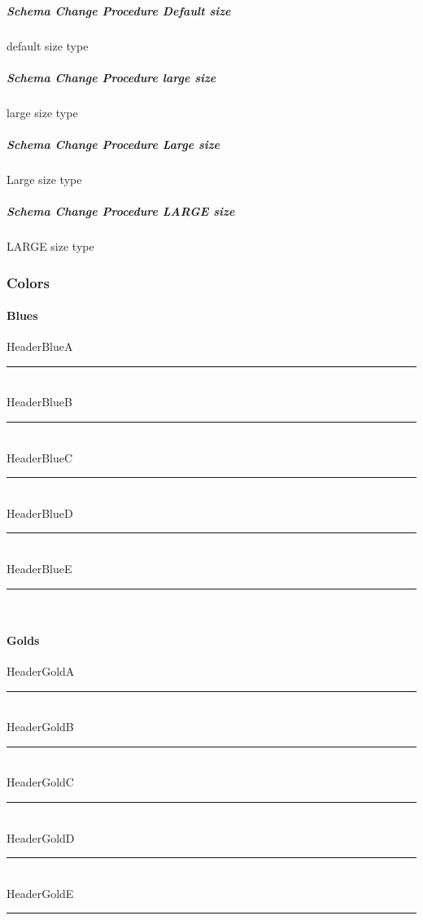 \subparagraph{Schema Change Procedure Default size}

default size type

\subparagraph*{\large Schema Change Procedure large size}

{\large large size type}

\subparagraph*{\Large Schema Change Procedure Large size}

{\Large Large size type}

\subparagraph*{\LARGE Schema Change Procedure LARGE size}

{\LARGE LARGE size type}

\clearpage

\subsubsection{Colors}
\paragraph[Blues]{Blues\texorpdfstring{\\}{}}
\textcolor{HeaderBlueA}{HeaderBlueA}
\noindent\textcolor{HeaderBlueA}{\rule{.5\textwidth}{.5mm}}\\
\textcolor{HeaderBlueB}{HeaderBlueB}
\noindent\textcolor{HeaderBlueB}{\rule{.5\textwidth}{.5mm}}\\
\textcolor{HeaderBlueC}{HeaderBlueC}
\noindent\textcolor{HeaderBlueC}{\rule{.5\textwidth}{.5mm}}\\
\textcolor{HeaderBlueD}{HeaderBlueD}
\noindent\textcolor{HeaderBlueD}{\rule{.5\textwidth}{.5mm}}\\
\textcolor{HeaderBlueE}{HeaderBlueE}
\noindent\textcolor{HeaderBlueE}{\rule{.5\textwidth}{.5mm}}\\
\paragraph[Golds]{Golds\texorpdfstring{\\}{}}
\textcolor{HeaderGoldA}{HeaderGoldA}
\noindent\textcolor{HeaderGoldA}{\rule{.5\textwidth}{.5mm}}\\
\textcolor{HeaderGoldB}{HeaderGoldB}
\noindent\textcolor{HeaderGoldB}{\rule{.5\textwidth}{.5mm}}\\
\textcolor{HeaderGoldC}{HeaderGoldC}
\noindent\textcolor{HeaderGoldC}{\rule{.5\textwidth}{.5mm}}\\
\textcolor{HeaderGoldD}{HeaderGoldD}
\noindent\textcolor{HeaderGoldD}{\rule{.5\textwidth}{.5mm}}\\
\textcolor{HeaderGoldE}{HeaderGoldE}
\noindent\textcolor{HeaderGoldE}{\rule{.5\textwidth}{.5mm}}\\
